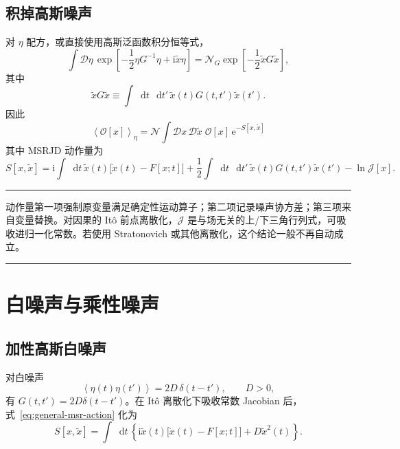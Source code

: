 \documentclass[UTF8,11pt,a4paper]{ctexart}
\newcommand{\dd}{\mathop{}\!\mathrm{d}}
\newcommand{\ii}{\mathrm{i}}
\newcommand{\ee}{\mathrm{e}}
\newcommand{\D}{\mathcal D}
\newcommand{\Jdet}{\mathcal J}
\newcommand{\avg}[1]{\left\langle #1\right\rangle}
\newenvironment{keybox}
  {\begin{center}\begin{minipage}{0.92\linewidth}\color{noteborder}\hrule\vspace{0.55em}\color{black}}
  {\vspace{0.45em}\color{noteborder}\hrule\end{minipage}\end{center}}
\begin{document}
\subsection{积掉高斯噪声}

对 $\eta$ 配方，或直接使用高斯泛函数积分恒等式，
\begin{equation}
  \int\D\eta\,
  \exp\!\left[
  -\frac12\eta G^{-1}\eta
  +\ii\widetilde x\eta
  \right]
  =\mathcal N_G
  \exp\!\left[-\frac12\widetilde xG\widetilde x\right],
  \label{eq:gaussian-noise-integration}
\end{equation}
其中
\begin{equation*}
  \widetilde xG\widetilde x
  \equiv\int\dd t\,\dd t'\,
  \widetilde x(t)G(t,t')\widetilde x(t').
\end{equation*}
因此
\begin{equation}
  \boxed{
  \avg{\mathcal O[x]}_\eta
  =\mathcal N
  \int\D x\,\D\widetilde x\;
  \mathcal O[x]\,\ee^{-S[x,\widetilde x]}
  }
  \label{eq:msr-average}
\end{equation}
其中 MSRJD 动作量为
\begin{equation}
  \boxed{
  S[x,\widetilde x]
  =\ii\int\dd t\,\widetilde x(t)
  \bigl[\dot x(t)-F[x;t]\bigr]
  +\frac12\int\dd t\,\dd t'\,
  \widetilde x(t)G(t,t')\widetilde x(t')
  -\ln\Jdet[x].
  }
  \label{eq:general-msr-action}
\end{equation}

\begin{keybox}
动作量第一项强制原变量满足确定性运动算子；第二项记录噪声协方差；第三项来自变量替换。对因果的 It\^o 前点离散化，$\Jdet$ 是与场无关的上/下三角行列式，可吸收进归一化常数。若使用 Stratonovich 或其他离散化，这个结论一般不再自动成立。
\end{keybox}

\section{白噪声与乘性噪声}

\subsection{加性高斯白噪声}

对白噪声
\begin{equation}
  \avg{\eta(t)\eta(t')}=2D\,\delta(t-t'),
  \qquad D>0,
  \label{eq:white-noise}
\end{equation}
有 $G(t,t')=2D\delta(t-t')$。在 It\^o 离散化下吸收常数 Jacobian 后，式~\eqref{eq:general-msr-action} 化为
\begin{equation}
  \boxed{
  S[x,\widetilde x]
  =\int\dd t\,
  \left\{
  \ii\widetilde x(t)\bigl[\dot x(t)-F[x;t]\bigr]
  +D\widetilde x^2(t)
  \right\}.
  }
  \label{eq:additive-white-action}
\end{equation}
\end{document}
